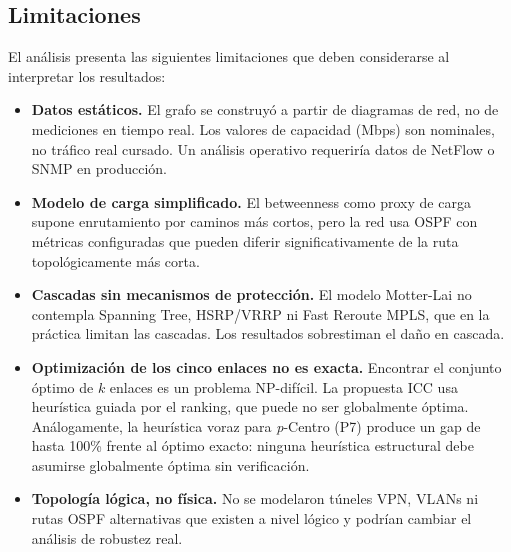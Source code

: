 \documentclass[12pt, a4paper]{article}
\begin{document}
\subsection{Limitaciones}

El análisis presenta las siguientes limitaciones que deben considerarse al
interpretar los resultados:

\begin{itemize}
    \item \textbf{Datos estáticos.} El grafo se construyó a partir de
    diagramas de red, no de mediciones en tiempo real. Los valores de
    capacidad (Mbps) son nominales, no tráfico real cursado. Un análisis
    operativo requeriría datos de NetFlow o SNMP en producción.

    \item \textbf{Modelo de carga simplificado.} El betweenness como proxy
    de carga supone enrutamiento por caminos más cortos, pero la red usa
    OSPF con métricas configuradas que pueden diferir significativamente de
    la ruta topológicamente más corta.

    \item \textbf{Cascadas sin mecanismos de protección.} El modelo
    Motter-Lai no contempla Spanning Tree, HSRP/VRRP ni Fast Reroute MPLS,
    que en la práctica limitan las cascadas. Los resultados sobrestiman el
    daño en cascada.

    \item \textbf{Optimización de los cinco enlaces no es exacta.} Encontrar
    el conjunto óptimo de $k$ enlaces es un problema NP-difícil. La propuesta
    ICC usa heurística guiada por el ranking, que puede no ser globalmente
    óptima. Análogamente, la heurística voraz para \textit{p}-Centro (P7)
    produce un gap de hasta 100\% frente al óptimo exacto: ninguna heurística
    estructural debe asumirse globalmente óptima sin verificación.

    \item \textbf{Topología lógica, no física.} No se modelaron túneles VPN,
    VLANs ni rutas OSPF alternativas que existen a nivel lógico y podrían
    cambiar el análisis de robustez real.
\end{itemize}

\end{document}
